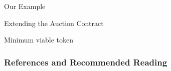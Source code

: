 \documentclass[]{beamer}
\begin{document}
\begin{frame}{Our Example}

	
\begin{figure}
	\begin{tikzpicture}
		
	\end{tikzpicture}
\end{figure}

\end{frame}


\begin{frame}{Extending the Auction Contract}
	\begin{samplecode}{Minimum viable token}
		
	\end{samplecode}
\end{frame}


\begin{frame}%
\frametitle{References and Recommended Reading}
	
	
\end{frame}
\end{document}
